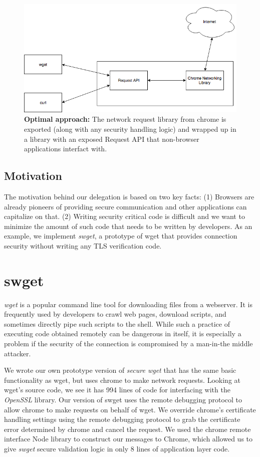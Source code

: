 \begin{figure}[h]
  \includegraphics[width=\textwidth]{figures/long-term} \caption[Optimal
  approach]{\textbf{Optimal approach:} The network request library from chrome
  is exported (along with any security handling logic) and wrapped up in a
  library with an exposed Request API that non-browser applications interfact
  with.} \label{fig:long-term-saber}
\end{figure}

\subsection{Motivation}
The motivation behind our delegation is based on two key facts: (1) Browsers
are already pioneers of providing secure communication and other applications
can capitalize on that. (2) Writing security critical code is difficult and we
want to minimize the amount of such code that needs to be written by
developers. As an example, we implement \emph{swget}, a prototype of wget that
provides connection security without writing any TLS verification code.

\section{swget}
\label{sec:swget-saber}

\emph{wget} is a popular command line tool for downloading files from a
webserver. It is frequently used by developers to crawl web pages, download
scripts, and sometimes directly pipe such scripts to the shell. While such a
practice of executing code obtained remotely can be dangerous in itself, it
is especially a problem if the security of the connection is compromised by a
man-in-the middle attacker.

We wrote our own prototype version of \emph{secure wget} that has the same
basic functionality as wget, but uses chrome to make network requests. Looking
at wget's source code, we see it has 994 lines of code for interfacing with the
\emph{OpenSSL} library. Our version of swget uses the remote debugging protocol
to allow chrome to make requests on behalf of wget. We override chrome's
certificate handling settings using the remote debugging protocol to grab the
certificate error determined by chrome and cancel the request. We used the
chrome remote interface Node library to construct our messages to Chrome, which
allowed us to give \emph{swget} secure validation logic in only 8 lines of
application layer code.


